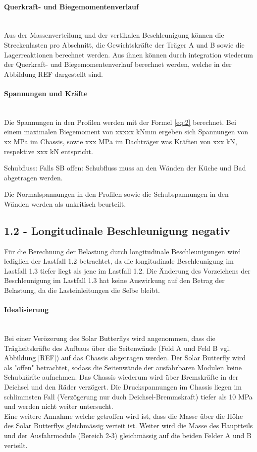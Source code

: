   \paragraph{Querkraft- und Biegemomentenverlauf}\mbox{}\\
  Aus der Massenverteilung und der vertikalen Beschleunigung können die Streckenlasten pro Abschnitt, die Gewichtskräfte der Träger A und B sowie die Lagerreaktionen berechnet werden. Aus ihnen können durch integration wiederum der Querkraft- und Biegemomentenverlauf berechnet werden, welche in der Abbildung REF dargestellt sind.

  \paragraph{Spannungen und Kräfte}\mbox{}\\
  Die Spannungen in den Profilen werden mit der Formel \ref{eq:2} berechnet. Bei einem maximalen Biegemoment von xxxxx kNmm ergeben sich Spannungen von xx MPa im Chassis, sowie xxx MPa im Dachträger was Kräften von xxx kN, respektive xxx kN entspricht.


  Schubfluss:
  Falls SB offen: Schubfluss muss an den Wänden der Küche und Bad abgetragen werden.

  Die Normalspannungen in den Profilen sowie die Schubspannungen in den Wänden werden als unkritisch beurteilt.

\subsection{1.2 - Longitudinale Beschleunigung negativ}
Für die Berechnung der Belastung durch longitudinale Beschleunigungen wird lediglich der Lastfall 1.2 betrachtet, da die longitudinale Beschleunigung im Lastfall 1.3 tiefer liegt als jene im Lastfall 1.2. Die Änderung des Vorzeichens der Beschleunigung im Lastfall 1.3 hat keine Auswirkung auf den Betrag der Belastung, da die Lasteinleitungen die Selbe bleibt.

  \paragraph{Idealisierung}\mbox{}\\
  Bei einer Verözerung des Solar Butterflys wird angenommen, dass die Trägheitskräfte des Aufbaus über die Seitenwände (Feld A und Feld B vgl. Abbildung [REF]) auf das Chassis abgetragen werden. Der Solar Butterfly wird als "offen" betrachtet, sodass die Seitenwände der ausfahrbaren Modulen keine Schubkärfte aufnehmen. Das Chassis  wiederum wird über Bremskräfte in der Deichsel und den Räder verzögert. Die Druckspannungen im Chassis liegen im schlimmsten Fall (Verzögerung nur duch Deichsel-Bremmskraft) tiefer als 10 MPa und werden nicht weiter untersucht.\\
  Eine weitere Annahme welche getroffen wird ist, dass die Masse über die Höhe des Solar Butterflys gleichmässig verteit ist. Weiter wird die Masse des Hauptteils und der Ausfahrmodule (Bereich 2-3) gleichmässig auf die beiden Felder A und B verteilt.

